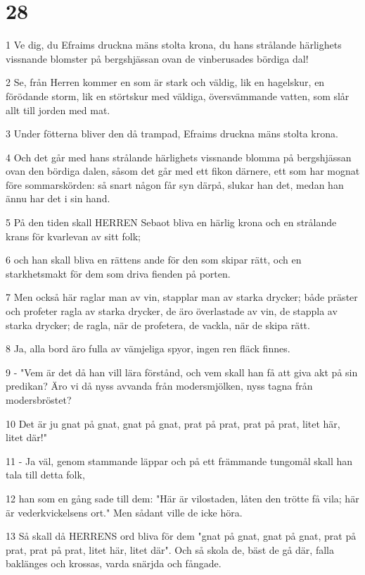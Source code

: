 \chapter{28}

\par 1 Ve dig, du Efraims druckna mäns stolta krona, du hans strålande härlighets vissnande blomster på bergshjässan ovan de vinberusades bördiga dal!
\par 2 Se, från Herren kommer en som är stark och väldig, lik en hagelskur, en förödande storm, lik en störtskur med väldiga, översvämmande vatten, som slår allt till jorden med mat.
\par 3 Under fötterna bliver den då trampad, Efraims druckna mäns stolta krona.
\par 4 Och det går med hans strålande härlighets vissnande blomma på bergshjässan ovan den bördiga dalen, såsom det går med ett fikon därnere, ett som har mognat före sommarskörden: så snart någon får syn därpå, slukar han det, medan han ännu har det i sin hand.
\par 5 På den tiden skall HERREN Sebaot bliva en härlig krona och en strålande krans för kvarlevan av sitt folk;
\par 6 och han skall bliva en rättens ande för den som skipar rätt, och en starkhetsmakt för dem som driva fienden på porten.
\par 7 Men också här raglar man av vin, stapplar man av starka drycker; både präster och profeter ragla av starka drycker, de äro överlastade av vin, de stappla av starka drycker; de ragla, när de profetera, de vackla, när de skipa rätt.
\par 8 Ja, alla bord äro fulla av vämjeliga spyor, ingen ren fläck finnes.
\par 9 - "Vem är det då han vill lära förstånd, och vem skall han få att giva akt på sin predikan? Äro vi då nyss avvanda från modersmjölken, nyss tagna från modersbröstet?
\par 10 Det är ju gnat på gnat, gnat på gnat, prat på prat, prat på prat, litet här, litet där!"
\par 11 - Ja väl, genom stammande läppar och på ett främmande tungomål skall han tala till detta folk,
\par 12 han som en gång sade till dem: "Här är vilostaden, låten den trötte få vila; här är vederkvickelsens ort." Men sådant ville de icke höra.
\par 13 Så skall då HERRENS ord bliva för dem "gnat på gnat, gnat på gnat, prat på prat, prat på prat, litet här, litet där". Och så skola de, bäst de gå där, falla baklänges och krossas, varda snärjda och fångade.
